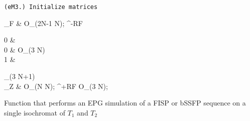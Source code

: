 \begin{algorithm}
    \texttt{(eM3.) Initialize matrices}
    \begin{flalign*}
    \Xi_F & \gets O_{(2N-1 \times N)};  
    \Omega^{-RF} \gets 
    \begin{bmatrix}
        0 &  \\
        0 & O_{(3 \times N)} \\
        1 &  
    \end{bmatrix}_{(3 \times N+1)} \\
    \Xi_Z  & \gets O_{(N \times N)};
    \Omega^{+RF}  \gets O_{(3 \times N)}; 
    \end{flalign*}
    
    
    \caption{Function that performs an EPG simulation of a FISP or bSSFP sequence on a single isochromat of $T_1$ and $T_2$}
    \label{alg:epgMATRIX}
\end{algorithm}

